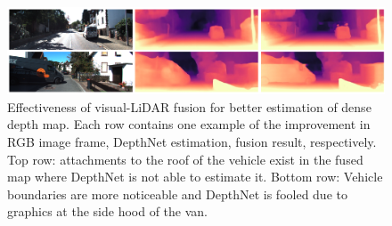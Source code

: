 \begin{figure}[t]
\centering
\includegraphics[width=\columnwidth]{Reports/3-Analysis-of-Baselines/images/HVLO-ablations-pic.png}
\caption{
    Effectiveness of visual-LiDAR fusion for better estimation of dense depth map. Each row contains one example of the improvement in RGB image frame, DepthNet estimation, fusion result, respectively. Top row: attachments to the roof of the vehicle exist in the fused map where DepthNet is not able to estimate it. Bottom row: Vehicle boundaries are more noticeable and DepthNet is fooled due to graphics at the side hood of the van.
}
\vspace{-0.4cm}
\label{fig:multimodal-pic}
\end{figure}